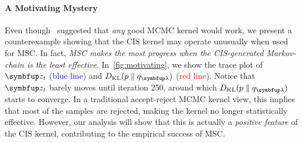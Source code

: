 
\vspace{-0.1in}
\paragraph{A Motivating Mystery}
Even though~\citeauthor{NEURIPS2020_b2070693} suggested that \textit{any} good MCMC kernel would work, we present a counterexample showing that the CIS kernel may operate unusually when used for MSC.
In fact, \textit{MSC makes the most progress when the CIS-generated Markov-chain is the least effective}.
In~\cref{fig:motivating}, we show the trace plot of \(\vz_t\) (\textcolor{blue}{blue line}) and \(\DKL{p}{q_{\vlambda}}\) (\textcolor{red}{red line}).
Notice that \(\vz_t\) barely moves until iteration 250, around which \(\DKL{p}{q_{\vlambda}}\) starts to converge.
In a traditional accept-reject MCMC kernel view, this implies that most of the samples are rejected, making the kernel no longer statistically effective.
However, our analysis will show that this is actually a \textit{positive feature} of the CIS kernel, contributing to the empirical success of MSC.


%

